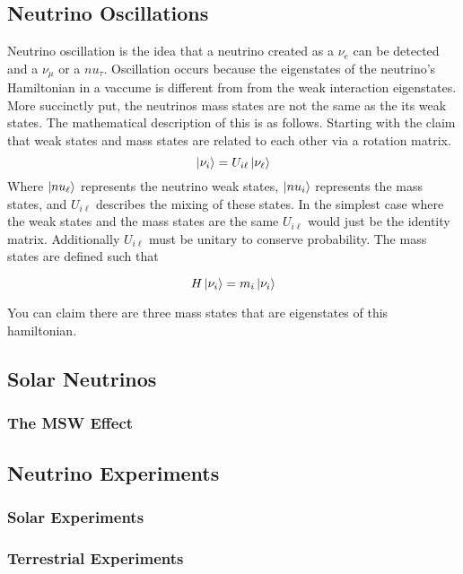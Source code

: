 \subsection{Neutrino Oscillations}
Neutrino oscillation is the idea that a neutrino created as a $\nu_e$ can be
detected and a $\nu_\mu$ or a $nu_\tau$.
Oscillation occurs because the eigenstates of the neutrino's Hamiltonian in a
vaccume is different from from the weak interaction eigenstates.
More succinctly put, the neutrinos mass states are not the same as the its weak
states.
The mathematical description of this is as follows.
Starting with the claim that weak states and mass states are related to
each other via a rotation matrix.
\begin{equation}
    \ket{\nu_{i}} = U_{i\ell}\ket{\nu_\ell}
\end{equation}
Where $\ket{nu_\ell}$ represents the neutrino weak states, $\ket{nu_i}$
represents the mass states, and $U_{i\ell}$ describes the mixing of these
states.
In the simplest case where the weak states and the mass states are the same
$U_{i\ell}$ would just be the identity matrix.
Additionally $U_{i\ell}$ must be unitary to conserve probability.
The mass states are defined such that

\begin{equation}
    H \ket{\nu_i} = m_i \ket{\nu_i}
\end{equation}

You can claim there are three mass states that are eigenstates of this
hamiltonian.

\subsection{Solar Neutrinos}
\subsubsection{The MSW Effect}
\subsection{Neutrino Experiments}
\subsubsection{Solar Experiments}
\subsubsection{Terrestrial Experiments}

